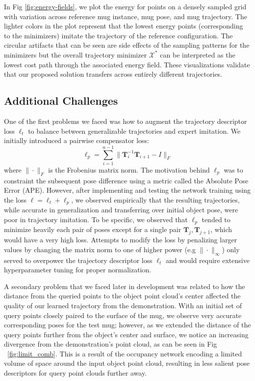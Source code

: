 \documentclass[10pt,twocolumn,letterpaper]{article}
\begin{document}
In Fig \ref{fig:energy-fields}, we plot the energy for points on a densely sampled grid with variation across reference mug instance, mug pose, and mug trajectory. The lighter colors in the plot represent that the lowest energy points (corresponding to the minimizers) imitate the trajectory of the reference configuration. The circular artifacts that can be seen are side effects of the sampling patterns for the minimizers but the overall trajectory minimizer $\mathcal{X}^*$ can be interpreted as the lowest cost path through the associated energy field. These visualizations validate that our proposed solution transfers across entirely different trajectories.

\subsection{Additional Challenges}
\label{challenges}

One of the first problems we faced was how to augment the trajectory descriptor loss $\ell_t$ to balance between generalizable trajectories and expert imitation. We initially introduced a pairwise compensator loss:
\begin{equation}
    \ell_p = \sum_{i = 1}^{n - 1} \|\mathbf{T}^{-1}_i \mathbf{T}_{i + 1} - I\|_{F}
\end{equation}
where $\|\cdot\|_{F}$ is the Frobenius matrix norm. The motivation behind $\ell_p$ was to constraint the subsequent pose difference using a metric called the Absolute Pose Error (APE). However, after implementing and testing the network training using the loss $\ell = \ell_t + \ell_p$, we observed empirically that the resulting trajectories, while accurate in generalization and transferring over initial object pose, were poor in trajectory imitation. To be specific, we observed that $\ell_p$ tended to minimize heavily each pair of poses except for a single pair $\mathbf{T}_j, \mathbf{T}_{j + 1}$, which would have a very high loss. Attempts to modify the loss by penalizing larger values by changing the matrix norm to one of higher power (e.g $\|\cdot\|_{\infty}$) only served to overpower the trajectory descriptor loss $\ell_t$ and would require extensive hyperparameter tuning for proper normalization.

A secondary problem that we faced later in development was related to how the distance from the queried points to the object point cloud's center affected the quality of our learned trajectory from the demonstration. With an initial set of query points closely paired to the surface of the mug, we observe very accurate corresponding poses for the test mug; however, as we extended the distance of the query points further from the object's center and surface, we notice an increasing divergence from the demonstration's point cloud, as can be seen in Fig ~\ref{fig:limit_comb}. This is a result of the occupancy network encoding a limited volume of space around the input object point cloud, resulting in less salient pose descriptors for query point clouds further away. 
\end{document}
